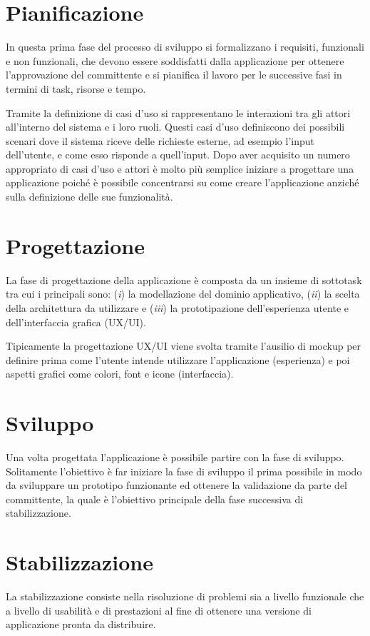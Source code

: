 \section{Pianificazione}
In questa prima fase del processo di sviluppo si formalizzano i requisiti, funzionali e non funzionali, che devono essere soddisfatti dalla applicazione per ottenere l'approvazione del committente e si pianifica il lavoro per le successive fasi in termini di task, risorse e tempo.

Tramite la definizione di casi d'uso si rappresentano le interazioni tra gli attori all'interno del sistema e i loro ruoli. Questi casi d'uso definiscono dei possibili scenari dove il sistema riceve delle richieste esterne, ad esempio l'input dell'utente, e come esso risponde a quell'input. Dopo aver acquisito un numero appropriato di casi d'uso e attori è molto più semplice iniziare a progettare una applicazione poiché è possibile concentrarsi su come creare l'applicazione anziché sulla definizione delle sue funzionalità.

\section{Progettazione}
La fase di progettazione della applicazione è composta da un insieme di sottotask tra cui i principali sono: (\textit{i}) la modellazione del dominio applicativo, (\textit{ii}) la scelta della architettura da utilizzare e (\textit{iii}) la prototipazione dell'esperienza utente e dell'interfaccia grafica (UX/UI).

Tipicamente la progettazione UX/UI viene svolta tramite l'ausilio di mockup per definire prima come l'utente intende utilizzare l'applicazione (esperienza) e poi aspetti grafici come colori, font e icone (interfaccia).

\section{Sviluppo}
Una volta progettata l'applicazione è possibile partire con la fase di sviluppo. Solitamente l'obiettivo è far iniziare la fase di sviluppo il prima possibile in modo da sviluppare un prototipo funzionante ed ottenere la validazione da parte del committente, la quale è l'obiettivo principale della fase successiva di stabilizzazione.

\section{Stabilizzazione}
La stabilizzazione consiste nella risoluzione di problemi sia a livello funzionale che a livello di usabilità e di prestazioni al fine di ottenere una versione di applicazione pronta da distribuire. 

